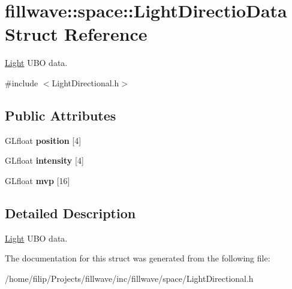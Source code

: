 \hypertarget{structfillwave_1_1space_1_1LightDirectioData}{}\section{fillwave\+:\+:space\+:\+:Light\+Directio\+Data Struct Reference}
\label{structfillwave_1_1space_1_1LightDirectioData}


\hyperlink{classfillwave_1_1space_1_1Light}{Light} U\+B\+O data.  




{\ttfamily \#include $<$Light\+Directional.\+h$>$}

\subsection*{Public Attributes}
\begin{DoxyCompactItemize}
\item 
\hypertarget{structfillwave_1_1space_1_1LightDirectioData_a8830a6c7449b6ec67dd42e3b24632cc5}{}G\+Lfloat {\bfseries position} \mbox{[}4\mbox{]}\label{structfillwave_1_1space_1_1LightDirectioData_a8830a6c7449b6ec67dd42e3b24632cc5}

\item 
\hypertarget{structfillwave_1_1space_1_1LightDirectioData_a0fded2fcb237ee74929cfcbc3e3db7ef}{}G\+Lfloat {\bfseries intensity} \mbox{[}4\mbox{]}\label{structfillwave_1_1space_1_1LightDirectioData_a0fded2fcb237ee74929cfcbc3e3db7ef}

\item 
\hypertarget{structfillwave_1_1space_1_1LightDirectioData_ae43973b237a1431879a6fc335220ebdf}{}G\+Lfloat {\bfseries mvp} \mbox{[}16\mbox{]}\label{structfillwave_1_1space_1_1LightDirectioData_ae43973b237a1431879a6fc335220ebdf}

\end{DoxyCompactItemize}


\subsection{Detailed Description}
\hyperlink{classfillwave_1_1space_1_1Light}{Light} U\+B\+O data. 

The documentation for this struct was generated from the following file\+:\begin{DoxyCompactItemize}
\item 
/home/filip/\+Projects/fillwave/inc/fillwave/space/Light\+Directional.\+h\end{DoxyCompactItemize}
